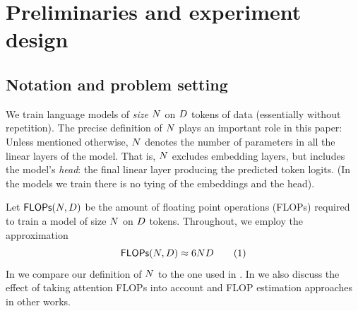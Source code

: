 \documentclass{article}
\newcommand{\workshop}[1]{baz}
\renewcommand{\workshop}[1]{\ignorespaces}%
\renewcommand{\workshop}[1]{#1}%
\renewcommand{\workshop}[1]{\ignorespaces}%
\theoremstyle{plain}
\theoremstyle{definition}
\theoremstyle{remark}
\newcommand\numberthis{\addtocounter{equation}{1}\tag{\theequation}}
\newcommand{\maybeSubscript}[1]{
  \ifthenelse{\equal{#1}{}}{}{_{#1}}%
}
\newcommand{\params}[1][]{N\maybeSubscript{#1}}
\newcommand{\tokens}[1][]{D\maybeSubscript{#1}}
\newcommand{\compute}{\mathsf{FLOPs}}
\begin{document}
\workshop{
    \paragraph{Limitations.} We discuss the limitations of our work in \Cref{app:limitations}.
} %
\section{Preliminaries and experiment design}\label{sec:preliminaries}

%

\subsection{Notation and problem setting}\label{subsec:notation}
We train language models of \emph{size} $\params$ on $\tokens$ tokens of data (essentially without repetition). The precise definition of $\params$ plays an important role in this paper: Unless mentioned otherwise, $\params$ denotes the number of parameters in all the linear layers of the model. That is, $\params$ excludes embedding layers, but includes the model's \emph{head}: the final linear layer producing the predicted token logits. (In the models we train there is no tying of the embeddings and the head). 

Let $\compute(\params, \tokens)$ be the amount of floating point operations (FLOPs) required to train a model of size $\params$ on $\tokens$ tokens. Throughout, we employ the approximation
\[
    \compute(\params, \tokens) \approx 6 \params \tokens
     \numberthis \label{eq:flop-approx}
\]
In  we compare our definition of $\params$ to the one used in \citet{kaplan2020scaling}. In  we also discuss the effect of taking attention FLOPs into account and FLOP estimation approaches in other works.
\end{document}
